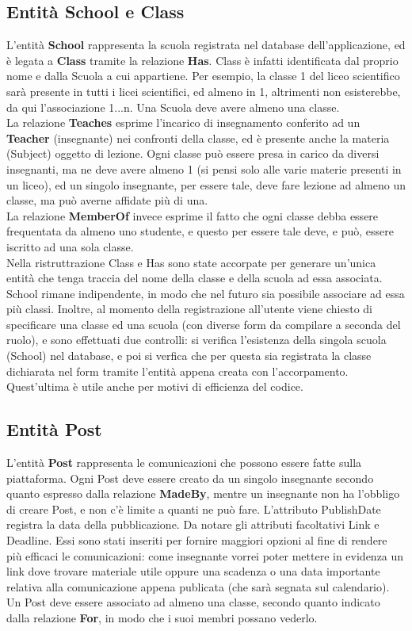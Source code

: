 \documentclass[Lau, binding=0.6cm, oneside]{sapthesis}
\begin{document}
\subsection{Entità School e Class}
L'entità \textbf{School} rappresenta la scuola registrata nel database dell'applicazione, ed è legata a \textbf{Class} tramite la relazione \textbf{Has}. Class è infatti identificata dal proprio nome e dalla Scuola a cui appartiene. Per esempio, la classe 1 del liceo scientifico sarà presente in tutti i licei scientifici, ed almeno in 1, altrimenti non esisterebbe, da qui l'associazione 1...n. Una Scuola deve avere almeno una classe.\\
La relazione \textbf{Teaches} esprime l'incarico di insegnamento conferito ad un \textbf{Teacher} (insegnante) nei confronti della classe, ed è presente anche la materia (Subject) oggetto di lezione. Ogni classe può essere presa in carico da diversi insegnanti, ma ne deve avere almeno 1 (si pensi solo alle varie materie presenti in  un liceo), ed un singolo insegnante, per essere tale, deve fare lezione ad almeno un classe, ma può averne affidate più di una.\\
La relazione \textbf{MemberOf} invece esprime il fatto che ogni classe debba essere frequentata da almeno uno studente, e questo per essere tale deve, e può, essere iscritto ad una sola classe.\\
Nella ristruttrazione Class e Has sono state accorpate per generare un'unica entità che tenga traccia del nome della classe e della scuola ad essa associata. School rimane indipendente, in modo che nel futuro sia possibile associare ad essa più classi. Inoltre, al momento della registrazione
all'utente viene chiesto di specificare una classe ed una scuola (con diverse form da compilare a seconda del ruolo), e sono effettuati due controlli: si verifica l'esistenza della singola scuola (School) nel database, e poi si verfica che per questa sia registrata la classe dichiarata nel form tramite l'entità appena creata con l'accorpamento. Quest'ultima è utile anche per motivi di efficienza del codice.

\subsection{Entità Post}
L'entità \textbf{Post} rappresenta le comunicazioni che possono essere fatte sulla piattaforma. Ogni Post deve essere creato da un singolo insegnante secondo quanto espresso dalla relazione \textbf{MadeBy}, mentre un insegnante non ha l'obbligo di creare Post, e non c'è limite a quanti ne può fare. L'attributo PublishDate registra la data della pubblicazione.
Da notare gli attributi facoltativi Link e Deadline. Essi sono stati inseriti per fornire maggiori opzioni al fine di rendere più efficaci le comunicazioni: come insegnante vorrei poter mettere in evidenza un link dove trovare materiale utile oppure una scadenza o una data importante relativa alla comunicazione appena publicata (che sarà segnata sul calendario).\\
Un Post deve essere associato ad almeno una classe, secondo quanto indicato dalla relazione \textbf{For}, in modo che i suoi membri possano vederlo.
\end{document}

